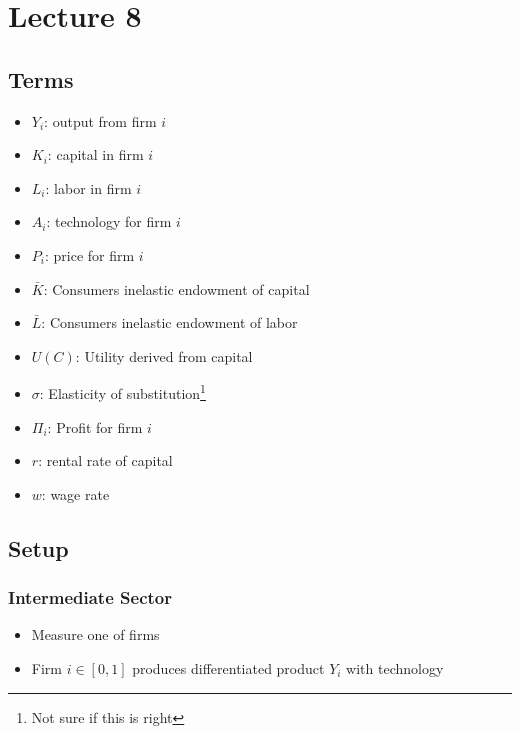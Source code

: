 \documentclass[10pt]{article}
\begin{document}

\section{Lecture 8}

\subsection{Terms}

\begin{itemize}
    \item $Y_i$: output from firm $i$
    \item $K_i$: capital in firm $i$
    \item $L_i$: labor in firm $i$
    \item $A_i$: technology for firm $i$
    \item $P_i$: price for firm $i$
    \item $\bar{K}$: Consumers inelastic endowment of capital 
    \item $\bar{L}$: Consumers inelastic endowment of labor
    \item $U(C)$: Utility derived from capital 
    \item $\sigma$: Elasticity of substitution\footnote{\color{red} Not sure if this is right} 
    \item $\Pi_i$: Profit for firm $i$
    \item $r$: rental rate of capital
    \item $w$: wage rate
\end{itemize}

\subsection{Setup}

\subsubsection{Intermediate Sector}

\begin{itemize}
    \item Measure one of firms
    \item Firm $i \in[0,1]$ produces differentiated product $Y_i$ with technology
\end{itemize}
\end{document}
